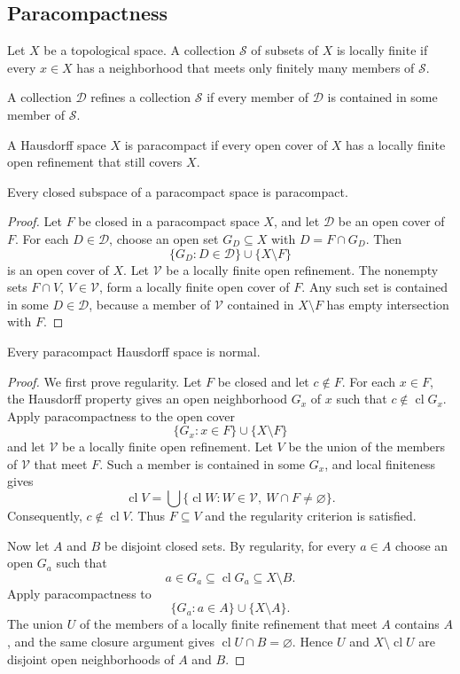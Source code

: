 \subsection{Paracompactness}

\begin{de}
Let $X$ be a topological space. A collection $\mathcal{S}$ of subsets of $X$
is locally finite if every $x\in X$ has a neighborhood that meets only
finitely many members of $\mathcal{S}$.

A collection $\mathcal{D}$ refines a collection $\mathcal{S}$ if every member
of $\mathcal{D}$ is contained in some member of $\mathcal{S}$.

A Hausdorff space $X$ is paracompact if every open cover of $X$ has a locally
finite open refinement that still covers $X$.
\end{de}

\begin{thm}
Every closed subspace of a paracompact space is paracompact.
\end{thm}

\begin{proof}
Let $F$ be closed in a paracompact space $X$, and let $\mathcal{D}$ be an open
cover of $F$. For each $D\in\mathcal{D}$, choose an open set $G_D\subseteq X$
with $D=F\cap G_D$. Then
\[
\{G_D:D\in\mathcal{D}\}\cup\{X\setminus F\}
\]
is an open cover of $X$. Let $\mathcal{V}$ be a locally finite open refinement.
The nonempty sets $F\cap V$, $V\in\mathcal{V}$, form a locally finite open
cover of $F$. Any such set is contained in some $D\in\mathcal{D}$, because a
member of $\mathcal{V}$ contained in $X\setminus F$ has empty intersection
with $F$.
\end{proof}

\begin{thm}
Every paracompact Hausdorff space is normal.
\end{thm}

\begin{proof}
We first prove regularity. Let $F$ be closed and let $c\notin F$. For each
$x\in F$, the Hausdorff property gives an open neighborhood $G_x$ of $x$ such
that $c\notin\operatorname{cl}G_x$. Apply paracompactness to the open cover
\[
\{G_x:x\in F\}\cup\{X\setminus F\}
\]
and let $\mathcal{V}$ be a locally finite open refinement. Let $V$ be the
union of the members of $\mathcal{V}$ that meet $F$. Such a member is
contained in some $G_x$, and local finiteness gives
\[
\operatorname{cl}V
=
\bigcup\{\operatorname{cl}W:W\in\mathcal{V},\ W\cap F\neq\varnothing\}.
\]
Consequently, $c\notin\operatorname{cl}V$. Thus $F\subseteq V$ and the
regularity criterion is satisfied.

Now let $A$ and $B$ be disjoint closed sets. By regularity, for every $a\in A$
choose an open $G_a$ such that
\[
a\in G_a\subseteq\operatorname{cl}G_a\subseteq X\setminus B.
\]
Apply paracompactness to
\[
\{G_a:a\in A\}\cup\{X\setminus A\}.
\]
The union $U$ of the members of a locally finite refinement that meet $A$
contains $A$, and the same closure argument gives
$\operatorname{cl}U\cap B=\varnothing$. Hence $U$ and
$X\setminus\operatorname{cl}U$ are disjoint open neighborhoods of $A$ and
$B$.
\end{proof}


